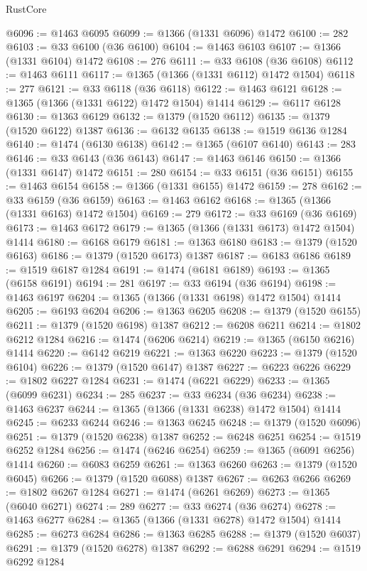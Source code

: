 \begin{lexlean}{RustCore}
\begin{coremodule}
@6096 := @1463 @6095
@6099 := @1366 (@1331 @6096) @1472
@6100 := 282
@6103 := @33 @6100 (@36 @6100)
@6104 := @1463 @6103
@6107 := @1366 (@1331 @6104) @1472
@6108 := 276
@6111 := @33 @6108 (@36 @6108)
@6112 := @1463 @6111
@6117 := @1365 (@1366 (@1331 @6112) @1472 @1504)
@6118 := 277
@6121 := @33 @6118 (@36 @6118)
@6122 := @1463 @6121
@6128 := @1365 (@1366 (@1331 @6122) @1472 @1504) @1414
@6129 := @6117 @6128
@6130 := @1363 @6129
@6132 := @1379 (@1520 @6112)
@6135 := @1379 (@1520 @6122) @1387
@6136 := @6132 @6135
@6138 := @1519 @6136 @1284
@6140 := @1474 (@6130 @6138)
@6142 := @1365 (@6107 @6140)
@6143 := 283
@6146 := @33 @6143 (@36 @6143)
@6147 := @1463 @6146
@6150 := @1366 (@1331 @6147) @1472
@6151 := 280
@6154 := @33 @6151 (@36 @6151)
@6155 := @1463 @6154
@6158 := @1366 (@1331 @6155) @1472
@6159 := 278
@6162 := @33 @6159 (@36 @6159)
@6163 := @1463 @6162
@6168 := @1365 (@1366 (@1331 @6163) @1472 @1504)
@6169 := 279
@6172 := @33 @6169 (@36 @6169)
@6173 := @1463 @6172
@6179 := @1365 (@1366 (@1331 @6173) @1472 @1504) @1414
@6180 := @6168 @6179
@6181 := @1363 @6180
@6183 := @1379 (@1520 @6163)
@6186 := @1379 (@1520 @6173) @1387
@6187 := @6183 @6186
@6189 := @1519 @6187 @1284
@6191 := @1474 (@6181 @6189)
@6193 := @1365 (@6158 @6191)
@6194 := 281
@6197 := @33 @6194 (@36 @6194)
@6198 := @1463 @6197
@6204 := @1365 (@1366 (@1331 @6198) @1472 @1504) @1414
@6205 := @6193 @6204
@6206 := @1363 @6205
@6208 := @1379 (@1520 @6155)
@6211 := @1379 (@1520 @6198) @1387
@6212 := @6208 @6211
@6214 := @1802 @6212 @1284
@6216 := @1474 (@6206 @6214)
@6219 := @1365 (@6150 @6216) @1414
@6220 := @6142 @6219
@6221 := @1363 @6220
@6223 := @1379 (@1520 @6104)
@6226 := @1379 (@1520 @6147) @1387
@6227 := @6223 @6226
@6229 := @1802 @6227 @1284
@6231 := @1474 (@6221 @6229)
@6233 := @1365 (@6099 @6231)
@6234 := 285
@6237 := @33 @6234 (@36 @6234)
@6238 := @1463 @6237
@6244 := @1365 (@1366 (@1331 @6238) @1472 @1504) @1414
@6245 := @6233 @6244
@6246 := @1363 @6245
@6248 := @1379 (@1520 @6096)
@6251 := @1379 (@1520 @6238) @1387
@6252 := @6248 @6251
@6254 := @1519 @6252 @1284
@6256 := @1474 (@6246 @6254)
@6259 := @1365 (@6091 @6256) @1414
@6260 := @6083 @6259
@6261 := @1363 @6260
@6263 := @1379 (@1520 @6045)
@6266 := @1379 (@1520 @6088) @1387
@6267 := @6263 @6266
@6269 := @1802 @6267 @1284
@6271 := @1474 (@6261 @6269)
@6273 := @1365 (@6040 @6271)
@6274 := 289
@6277 := @33 @6274 (@36 @6274)
@6278 := @1463 @6277
@6284 := @1365 (@1366 (@1331 @6278) @1472 @1504) @1414
@6285 := @6273 @6284
@6286 := @1363 @6285
@6288 := @1379 (@1520 @6037)
@6291 := @1379 (@1520 @6278) @1387
@6292 := @6288 @6291
@6294 := @1519 @6292 @1284

\end{coremodule}
\end{lexlean}
